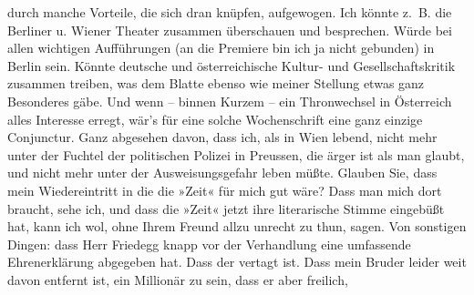 \begin{ledgroupsized}[t]{13cm}
               durch manche Vorteile, {\pb}die
               sich dran knüpfen, aufgewogen. Ich könnte z. B. die Berliner u. Wiener Theater zusammen
               überschauen und besprechen. Würde bei allen wichtigen Aufführungen (an die Premiere
               bin ich ja nicht gebunden) in Berlin sein. Könnte
                  deutsche und österreichische Kultur- und
               Gesellschaftskritik zusammen treiben, was dem Blatte ebenso wie meiner Stellung etwas ganz Besonderes gäbe. Und wenn – binnen Kurzem
               – ein Thronwechsel in Österreich alles
               Interesse erregt, wär’s für eine solche Wochenschrift eine ganz einzige Conjunctur.
               Ganz abgesehen davon, dass ich, als in Wien
               lebend, nicht mehr unter der Fuchtel der politischen Polizei in Preussen, die ärger ist als man glaubt, und nicht mehr unter
               der Ausweisungsgefahr leben müßte.\pend
           \pstart
           Glauben Sie, dass mein Wiedereintritt in die die »Zeit« für mich gut wäre? Dass man mich dort braucht, sehe ich, und dass die
                  »Zeit« jetzt ihre literarische Stimme
               eingebüßt hat, kann ich wol, ohne Ihrem Freund \label{K_L03430-4v}\label{K_L03430-4h} allzu unrecht zu thun, sagen.\pend
           \pstart
           Von sonstigen Dingen: dass Herr Friedegg
               knapp vor der Verhandlung eine umfassende Ehrenerklärung abgegeben hat. Dass der
                  \label{K_L03430-5v}\label{K_L03430-5h} vertagt ist. Dass mein Bruder leider weit davon entfernt ist, ein Millionär {\pb}zu sein, dass er aber freilich,

\end{ledgroupsized}
